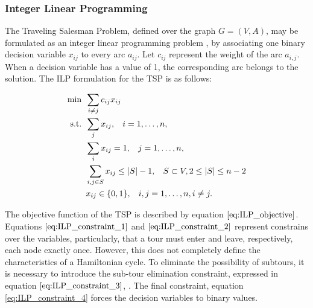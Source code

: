 \subsubsection{Integer Linear Programming}
\label{sec:TDTSP_ILP}

The Traveling Salesman Problem, defined over the graph $G=(V,A)$, may be formulated as an integer linear programming problem \cite{tsp_exact_review}, by associating one binary decision variable $x_{ij}$ to every arc $a_{ij}$. Let $c_{ij}$ represent the weight of the arc $a_{i,j}$. When a decision variable has a value of 1, the corresponding arc belongs to the solution. The ILP formulation for the TSP is as follows:

\begin{align}
  \min  &\hspace{0.5em} \sum_{i \ne j}c_{ij}x_{ij} \label{eq:ILP_objective} \\
  \mathrm{s.t.}   &\hspace{0.5em} \sum_{j} x_{ij}, \hspace{3mm} i = 1, \ldots, n, \label{eq:ILP_constraint_1}\\
  & \hspace{0.5em} \sum_{i} x_{ij} = 1, \hspace{3mm} j = 1, \ldots, n, \label{eq:ILP_constraint_2}\\
  & \hspace{0.5em} \sum_{i,j \in S} x_{ij} \leq |S|-1, \hspace{3mm} S \subset V, 2 \leq |S| \leq n-2 \label{eq:ILP_constraint_3}\\
  & \hspace{0.5em} x_{ij} \in \{0, 1\}, \hspace{3mm} i, j = 1, \ldots, n, i \ne j. \label{eq:ILP_constraint_4}
\end{align}

The objective function of the TSP is described by equation $\ref{eq:ILP_objective}$. Equations $\ref{eq:ILP_constraint_1}$ and $\ref{eq:ILP_constraint_2}$ represent constrains over the variables, particularly, that a tour must enter and leave, respectively, each node exactly once. However, this does not completely define the characteristics of a Hamiltonian cycle. To eliminate the possibility of subtours, it is necessary to introduce the sub-tour elimination constraint, expressed in equation $\ref{eq:ILP_constraint_3}$, . The final constraint, equation \ref{eq:ILP_constraint_4} forces the decision variables to binary values.



